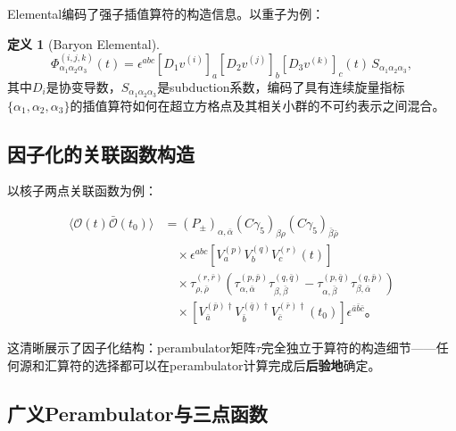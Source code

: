 \documentclass[12pt,a4paper]{ctexart}
\theoremstyle{definition}
\newtheorem{definition}{定义}[section]
\begin{document}
Elemental编码了强子插值算符的构造信息\cite{Peardon2009,Egerer2021a}。以重子为例：

\begin{definition}[Baryon Elemental]
\begin{equation}
\Phi^{(i,j,k)}_{\alpha_1\alpha_2\alpha_3}(t) = \epsilon^{abc} \left[D_1 v^{(i)}\right]_a \left[D_2 v^{(j)}\right]_b \left[D_3 v^{(k)}\right]_c (t) \, S_{\alpha_1\alpha_2\alpha_3},
\label{eq:elemental}
\end{equation}
其中$D_i$是协变导数，$S_{\alpha_1\alpha_2\alpha_3}$是subduction系数，编码了具有连续旋量指标$\{\alpha_1,\alpha_2,\alpha_3\}$的插值算符如何在超立方格点及其相关小群的不可约表示之间混合。
\end{definition}

\subsection{因子化的关联函数构造}

以核子两点关联函数为例\cite{Peardon2009,NoteGluonPDFs}：

\begin{equation}
\begin{aligned}
\langle \mathcal{O}(t) \bar{\mathcal{O}}(t_0) \rangle &= (P_\pm)_{\alpha,\bar{\alpha}} (C\gamma_5)_{\beta\rho} (C\gamma_5)_{\bar{\beta}\bar{\rho}} \\
&\quad \times \epsilon^{abc} \left[ V^{(p)}_a V^{(q)}_b V^{(r)}_c (t) \right] \\
&\quad \times \tau^{(r,\bar{r})}_{\rho,\bar{\rho}} \left( \tau^{(p,\bar{p})}_{\alpha,\bar{\alpha}} \tau^{(q,\bar{q})}_{\beta,\bar{\beta}} - \tau^{(p,\bar{q})}_{\alpha,\bar{\beta}} \tau^{(q,\bar{p})}_{\beta,\bar{\alpha}} \right) \\
&\quad \times \left[ V^{(\bar{p})\dagger}_{\bar{a}} V^{(\bar{q})\dagger}_{\bar{b}} V^{(\bar{r})\dagger}_{\bar{c}} (t_0) \right] \epsilon^{\bar{a}\bar{b}\bar{c}}。
\end{aligned}
\label{eq:factorized_2pt}
\end{equation}

这清晰展示了因子化结构：perambulator矩阵$\tau$完全独立于算符的构造细节——任何源和汇算符的选择都可以在perambulator计算完成后\textbf{后验地}确定\cite{Peardon2009}。

\subsection{广义Perambulator与三点函数}
\end{document}
